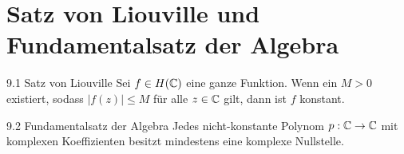 \section{Satz von Liouville und Fundamentalsatz der Algebra}

\begin{satz}{9.1 Satz von Liouville}
Sei $f \in H(\mathbb{C})$ eine ganze Funktion. Wenn ein $M > 0$ existiert, sodass $|f(z)| \le M$ für alle $z \in \mathbb{C}$ gilt, dann ist $f$ konstant.
\end{satz}

\begin{satz}{9.2 Fundamentalsatz der Algebra}
Jedes nicht-konstante Polynom $p: \mathbb{C} \to \mathbb{C}$ mit komplexen Koeffizienten besitzt mindestens eine komplexe Nullstelle.
\end{satz}